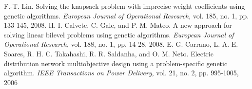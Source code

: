 \documentclass[twoside]{article}
\begin{document}
\begin{multicols}{2}
\begin{thebibliography}{9}
	F.-T. Lin. Solving the knapsack problem with imprecise weight coefficients using genetic algorithms. \textit{European Journal of Operational Research}, vol. 185, no. 1, pp. 133-145, 2008.
	H. I. Calvete, C. Gale, and P. M. Mateo. A new approach for solving linear bilevel problems using genetic algorithms. \textit{European Journal of Operational Research}, vol. 188, no. 1, pp. 14-28, 2008.
	E. G. Carrano, L. A. E. Soares, R. H. C. Takahashi, R. R. Saldanha, and O. M. Neto. Electric distribution network multiobjective design using a problem-specific genetic algorithm. \textit{IEEE Transactions on Power Delivery}, vol. 21, no. 2, pp. 995-1005, 2006
	


%
%


%


\end{thebibliography}


\end{multicols}
\end{document}
